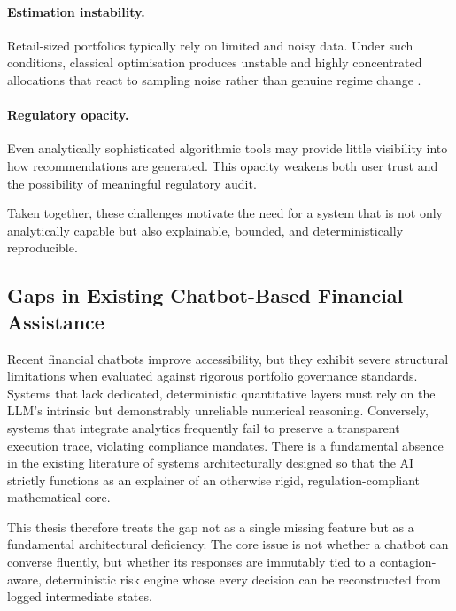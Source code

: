 \documentclass[11pt]{article}
\begin{document}
\paragraph{Estimation instability.} Retail-sized portfolios typically rely on limited and noisy data. Under such conditions, classical optimisation produces unstable and highly concentrated allocations that react to sampling noise rather than genuine regime change \cite{michaud1989,chopra1993}.

\paragraph{Regulatory opacity.} Even analytically sophisticated algorithmic tools may provide little visibility into how recommendations are generated. This opacity weakens both user trust and the possibility of meaningful regulatory audit.

Taken together, these challenges motivate the need for a system that is not only analytically capable but also explainable, bounded, and deterministically reproducible.

\subsection{Gaps in Existing Chatbot-Based Financial Assistance}
Recent financial chatbots improve accessibility, but they exhibit severe structural limitations when evaluated against rigorous portfolio governance standards. Systems that lack dedicated, deterministic quantitative layers must rely on the LLM's intrinsic but demonstrably unreliable numerical reasoning. Conversely, systems that integrate analytics frequently fail to preserve a transparent execution trace, violating compliance mandates. There is a fundamental absence in the existing literature of systems architecturally designed so that the AI strictly functions as an explainer of an otherwise rigid, regulation-compliant mathematical core.

This thesis therefore treats the gap not as a single missing feature but as a fundamental architectural deficiency. The core issue is not whether a chatbot can converse fluently, but whether its responses are immutably tied to a contagion-aware, deterministic risk engine whose every decision can be reconstructed from logged intermediate states.
\end{document}
